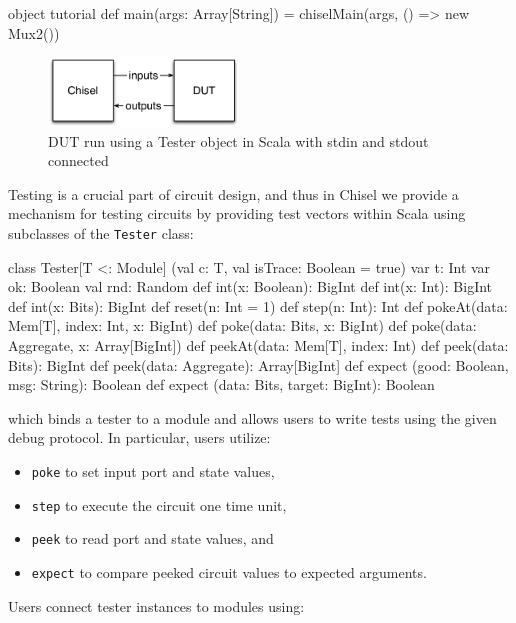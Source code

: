 \documentclass[twocolumn,10pt]{article}
\def\code#1{{\tt #1}}
\begin{document}
\begin{scala}
object tutorial {
  def main(args: Array[String]) = {
    chiselMain(args, () => new Mux2())
  }
}
\end{scala}

\begin{figure}
\begin{center}
\includegraphics[width=0.45\textwidth]{../tutorial/figs/DUT.pdf}
\end{center}
\caption{DUT run using a Tester object in Scala with stdin and stdout connected}
\label{fig:dut}
\end{figure}
 
Testing is a crucial part of circuit design, 
and thus in Chisel we provide a mechanism for
testing circuits by providing test vectors within Scala using
subclasses of the \code{Tester} class:

\begin{scala}
class Tester[T <: Module] (val c: T, val isTrace: Boolean = true) {
  var t: Int
  var ok: Boolean
  val rnd: Random
  def int(x: Boolean): BigInt
  def int(x: Int): BigInt
  def int(x: Bits): BigInt
  def reset(n: Int = 1)
  def step(n: Int): Int
  def pokeAt(data: Mem[T], index: Int, x: BigInt)
  def poke(data: Bits, x: BigInt)
  def poke(data: Aggregate, x: Array[BigInt])
  def peekAt(data: Mem[T], index: Int)
  def peek(data: Bits): BigInt
  def peek(data: Aggregate): Array[BigInt]
  def expect (good: Boolean, msg: String): Boolean
  def expect (data: Bits, target: BigInt): Boolean
}
\end{scala}

\noindent
which binds a tester to a module
and allows users to write tests using the given debug protocol.  In particular, users utilize:
\begin{itemize}
\item \code{poke} to set input port and state values,
\item \code{step} to execute the circuit one time unit,
\item \code{peek} to read port and state values, and
\item \code{expect} to compare peeked circuit values to expected arguments.
\end{itemize}

\noindent
Users connect tester instances to modules using:
\end{document}
